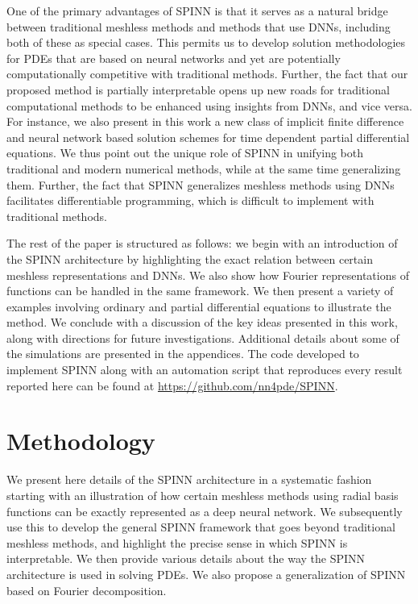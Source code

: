 \documentclass[12pt]{article}
\newcommand{\rb}[1]{#1}
\newcommand{\rR}[1]{#1}
\begin{document}
One of the primary advantages of SPINN is that it serves as a natural bridge between traditional meshless methods and methods that use DNNs, including both of these as special cases. This permits us to develop solution methodologies for PDEs that are based on neural networks and yet are \rb{potentially} computationally competitive with traditional methods. Further, the fact that our proposed method is \rR{partially} interpretable opens up new roads for traditional computational methods to be enhanced using insights from DNNs, and vice versa. For instance, we also present in this work a new class of implicit finite difference and neural network based solution schemes for time dependent partial differential equations. We thus point out the unique role of SPINN in unifying both traditional and modern numerical methods, while at the same time generalizing them. Further, the fact that SPINN generalizes meshless methods using DNNs facilitates differentiable programming, which is difficult to implement with traditional methods.

The rest of the paper is structured as follows: we begin with an introduction of the SPINN architecture by highlighting the exact relation between certain meshless representations and DNNs. We also show how Fourier representations of functions can be handled in the same framework. We then present a variety of examples involving ordinary and partial differential equations to illustrate the method. We conclude with a discussion of the key ideas presented in this work, along with directions for future investigations. Additional details about some of the simulations are presented in the appendices. The code developed to implement SPINN along with an automation script that reproduces every result reported here can be found at \url{https://github.com/nn4pde/SPINN}.

\section{Methodology}
We present here details of the SPINN architecture in a systematic fashion starting with an illustration of how certain meshless methods using radial basis functions can be exactly represented as a deep neural network. We subsequently use this to develop the general SPINN framework that goes beyond traditional meshless methods, and highlight the precise sense in which SPINN is interpretable. We then provide various details about the way the SPINN architecture is used in solving PDEs. We also propose a generalization of SPINN based on Fourier decomposition.
\end{document}
